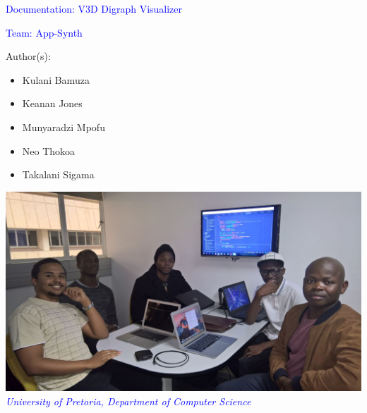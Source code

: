 \documentclass[12pt]{article}
\begin{document}
\begin{titlepage}
\begin{center}
\begin{huge}
\begin{center}
\textcolor{blue}{Documentation: V3D Digraph Visualizer}
\end{center}
\end{huge}
\hfill \break
\begin{Large}
\begin{center}
\textcolor{blue}{Team: App-Synth}
\end{center}
\end{Large}
\begin{small}
\begin{flushleft}
Author(s):
\end{flushleft}

\begin{itemize}
  \item Kulani Bamuza \\
  \item Keanan Jones \\
  \item Munyaradzi Mpofu\\
  \item Neo Thokoa\\  
  \item Takalani Sigama\\
  
\end{itemize}
\end{small}

\end{center}
\begin{center}
\includegraphics[scale=0.4]{Dps/TeamPic.jpg}
\\
\textcolor{blue}{\textit{University of Pretoria, Department of Computer Science
\\
}}

\end{center}
\end{titlepage}
\end{document}
